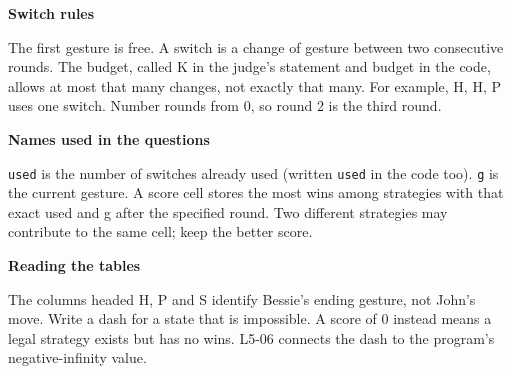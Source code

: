 \documentclass[11pt,a4paper]{article}
\begin{document}
\textbf{Switch rules}\par The first gesture is free. A switch is a change of gesture between two consecutive rounds. The budget, called K in the judge's statement and budget in the code, allows at most that many changes, not exactly that many. For example, H, H, P uses one switch. Number rounds from 0, so round 2 is the third round.\par\medskip
\textbf{Names used in the questions}\par \texttt{used} is the number of switches already used (written \texttt{used} in the code too). \texttt{g} is the current gesture. A score cell stores the most wins among strategies with that exact used and g after the specified round. Two different strategies may contribute to the same cell; keep the better score.\par\medskip
\textbf{Reading the tables}\par The columns headed H, P and S identify Bessie's ending gesture, not John's move. Write a dash for a state that is impossible. A score of 0 instead means a legal strategy exists but has no wins. L5-06 connects the dash to the program's negative-infinity value.\par\medskip
\end{document}
